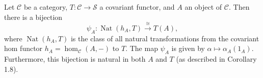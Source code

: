 Let $\mathcal{C}$ be a category, $T : \mathcal{C} \to \mathcal{S}$ a covariant functor, and $A$ an object of $\mathcal{C}$. Then there is a bijection
\[
\psi_A : \operatorname{Nat}(h_A, T) \xrightarrow{\cong} T(A),
\]
where $\operatorname{Nat}(h_A, T)$ is the class of all natural transformations from the covariant hom functor $h_A = \hom_{\mathcal{C}}(A, -)$ to $T$. The map $\psi_A$ is given by $\alpha \mapsto \alpha_A(1_A)$. Furthermore, this bijection is natural in both $A$ and $T$ (as described in Corollary 1.8).
